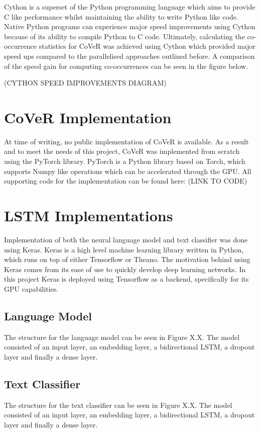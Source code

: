 \noindent
\newline
Cython is a superset of the Python programming language which aims to provide C like performance whilst maintaining the ability to write Python like code. Native Python programs can experience major speed improvements using Cython because of its ability to compile Python to C code. Ultimately, calculating the co-occurrence statistics for CoVeR was achieved using Cython which provided major speed ups compared to the parallelised approaches outlined before. A comparison of the speed gain for computing co-occurrences can be seen in the figure below.

\noindent
\newline
(CYTHON SPEED IMPROVEMENTS DIAGRAM)  

\section{CoVeR Implementation}
At time of writing, no public implementation of CoVeR is available. As a result and to meet the needs of this project, CoVeR was implemented from scratch using the PyTorch library. PyTorch is a Python library based on Torch, which supports Numpy like operations which can be accelerated through the GPU. All supporting code for the implementation can be found here: (LINK TO CODE)

\section{LSTM Implementations}
Implementation of both the neural language model and text classifier was done using Keras. Keras is a high level machine learning library written in Python, which runs on top of either Tensorflow or Theano. The motivation behind using Keras comes from its ease of use to quickly develop deep learning networks. In this project Keras is deployed using Tensorflow as a backend, specifically for its GPU capabilities.
\subsection{Language Model}
The structure for the language model can be seen in Figure X.X. The model consisted of an input layer, an embedding layer, a bidirectional LSTM, a dropout layer and finally a dense layer.
\subsection{Text Classifier}
The structure for the text classifier can be seen in Figure X.X. The model consisted of an input layer, an embedding layer, a bidirectional LSTM, a dropout layer and finally a dense layer.
